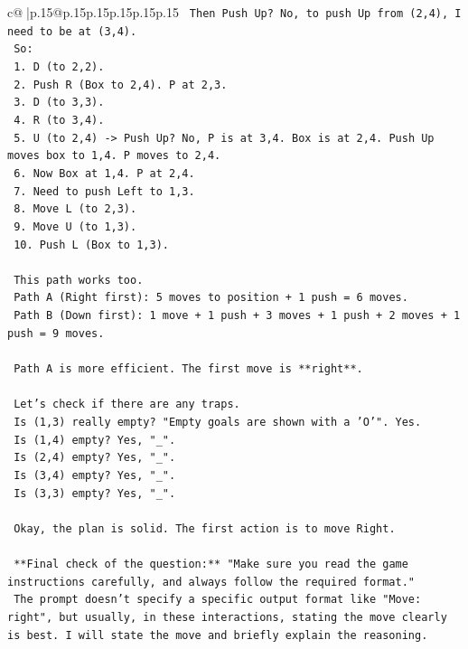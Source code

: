 \documentclass{article}
\begin{document}
{\begin{supertabular}{c@{$\;$}|p{.15\linewidth}@{}p{.15\linewidth}p{.15\linewidth}p{.15\linewidth}p{.15\linewidth}p{.15\linewidth}}
{{{\texttt{   Then Push Up? No, to push Up from (2,4), I need to be at (3,4).} \\
\texttt{   So:} \\
\texttt{   1. D (to 2,2).} \\
\texttt{   2. Push R (Box to 2,4). P at 2,3.} \\
\texttt{   3. D (to 3,3).} \\
\texttt{   4. R (to 3,4).} \\
\texttt{   5. U (to 2,4) {-}> Push Up? No, P is at 3,4. Box is at 2,4. Push Up moves box to 1,4. P moves to 2,4.} \\
\texttt{   6. Now Box at 1,4. P at 2,4.} \\
\texttt{   7. Need to push Left to 1,3.} \\
\texttt{   8. Move L (to 2,3).} \\
\texttt{   9. Move U (to 1,3).} \\
\texttt{   10. Push L (Box to 1,3).} \\
\\ 
\texttt{   This path works too.} \\
\texttt{   Path A (Right first): 5 moves to position + 1 push = 6 moves.} \\
\texttt{   Path B (Down first): 1 move + 1 push + 3 moves + 1 push + 2 moves + 1 push = 9 moves.} \\
\\ 
\texttt{   Path A is more efficient. The first move is **right**.} \\
\\ 
\texttt{   Let's check if there are any traps.} \\
\texttt{   Is (1,3) really empty? "Empty goals are shown with a 'O'". Yes.} \\
\texttt{   Is (1,4) empty? Yes, "\_".} \\
\texttt{   Is (2,4) empty? Yes, "\_".} \\
\texttt{   Is (3,4) empty? Yes, "\_".} \\
\texttt{   Is (3,3) empty? Yes, "\_".} \\
\\ 
\texttt{   Okay, the plan is solid. The first action is to move Right.} \\
\\ 
\texttt{   **Final check of the question:** "Make sure you read the game instructions carefully, and always follow the required format."} \\
\texttt{   The prompt doesn't specify a specific output format like "Move: right", but usually, in these interactions, stating the move clearly is best. I will state the move and briefly explain the reasoning.} \\
}}}
\end{supertabular}}
\end{document}

